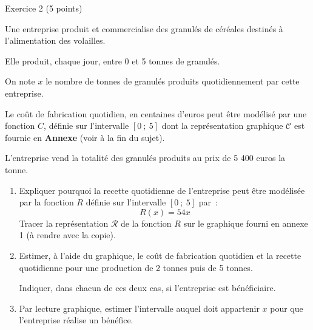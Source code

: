 
%
\begin{h2}Exercice 2 (5 points)\end{h2}
\par
\medskip
\par
Une entreprise produit et commercialise des granulés de céréales destinés à l'alimentation des volailles.
\par
Elle produit, chaque jour, entre 0 et 5 tonnes de granulés.
\par
On note $x$ le nombre de tonnes de granulés produits quotidiennement par cette entreprise.
\par
Le coût de fabrication quotidien, en centaines d'euros peut être modélisé par une fonction $C$, définie sur l'intervalle $[0~;~5]$  dont la représentation graphique $\mathscr{C}$ est fournie en \textbf{Annexe} (voir à la fin du sujet).
\par
L'entreprise vend la totalité des granulés produits au prix de 5 400 euros la tonne.
\par
%
%
\par
\begin{enumerate}
     \item Expliquer pourquoi la recette quotidienne de l'entreprise peut être modélisée par la fonction $R$ définie sur l'intervalle $[0~;~5]$ par~:
     \[ R(x)= 54x \]
     Tracer la représentation $\mathscr{R}$ de la fonction $R$ sur le graphique fourni en annexe 1 (à rendre avec la copie).
     \par
     \medskip
     \par
     \item Estimer, à l'aide du graphique, le coût de fabrication quotidien et la recette quotidienne pour une production de 2 tonnes puis de 5 tonnes.
     \par
     Indiquer, dans chacun de ces deux cas, si l'entreprise est bénéficiaire.
     \par
     \medskip
     \par
     \item Par lecture graphique, estimer l'intervalle auquel doit appartenir $x$ pour que l'entreprise réalise un bénéfice.
\end{enumerate}
\par
%
